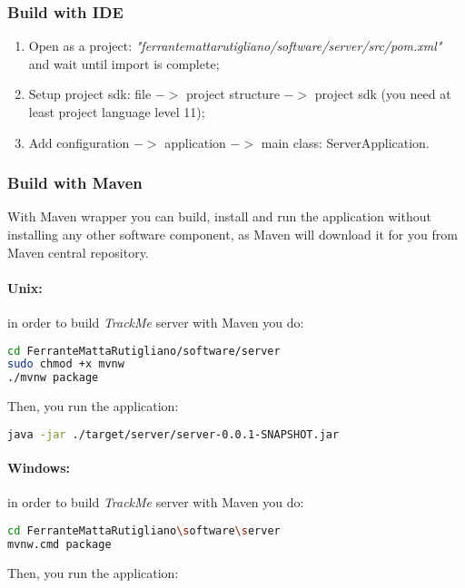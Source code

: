 \documentclass[a4paper]{article}
\begin{document}
\subsubsection{Build with IDE}
\begin{enumerate}
    \item Open as a project: \textit{"ferrantemattarutigliano/software/server/src/pom.xml"} and wait until import is complete;
    \item Setup project sdk: file ${->}$ project structure ${->}$ project sdk (you need at least project language level 11);
    \item Add configuration ${->}$ application ${->}$ main class: ServerApplication.
\end{enumerate}

\subsubsection{Build with Maven}
With Maven wrapper you can build, install and run the application without installing any other software component, as Maven will download it for you from Maven central repository.

\paragraph{Unix:} in order to build \textit{TrackMe} server with Maven you do:

\begin{lstlisting}[language=bash]
cd FerranteMattaRutigliano/software/server
sudo chmod +x mvnw
./mvnw package
\end{lstlisting}

Then, you run the application:

\begin{lstlisting}[language=bash]
java -jar ./target/server/server-0.0.1-SNAPSHOT.jar
\end{lstlisting}

\paragraph{Windows:} in order to build \textit{TrackMe} server with Maven you do:

\begin{lstlisting}[language=bash]
cd FerranteMattaRutigliano\software\server
mvnw.cmd package
\end{lstlisting}

Then, you run the application:
\end{document}
